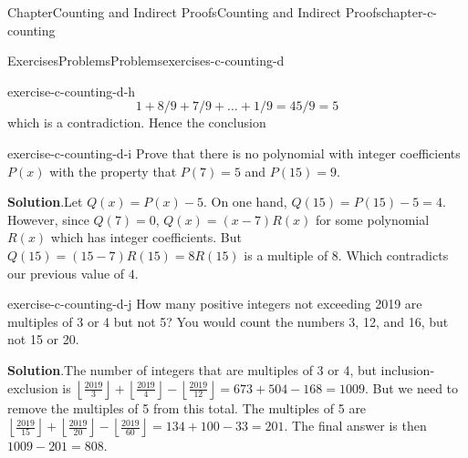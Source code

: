 \documentclass[oneside,10pt,]{book}
\newcommand{\blocktitlefont}{\relax}
\numberwithin{equation}{section}
\begin{document}
\begin{chapterptx}{Chapter}{Counting and Indirect Proofs}{}{Counting and Indirect Proofs}{}{}{chapter-c-counting}
\begin{exercises-section}{Exercises}{Problems}{}{Problems}{}{}{exercises-c-counting-d}
\begin{divisionexercise}{7}{}{}{exercise-c-counting-d-h}
\begin{equation*}
1 + 8/9 + 7/9 + \dots + 1/9 = 45/9 = 5
\end{equation*}
which is a contradiction. Hence the conclusion%
\end{divisionexercise}%
\begin{divisionexercise}{8}{}{}{exercise-c-counting-d-i}%
Prove that there is no polynomial with integer coefficients \(P(x)\) with the property that \(P(7) = 5\) and \(P(15) = 9\).%
\par\smallskip%
\noindent\textbf{\blocktitlefont Solution}.\hypertarget{solution-c-counting-d-i-b}{}\quad{}Let \(Q(x)=P(x)-5\).  On one hand, \(Q(15)=P(15)-5 = 4\).  However, since \(Q(7)=0\), \(Q(x)=(x-7)R(x)\) for some polynomial \(R(x)\) which has integer coefficients.  But \(Q(15)=(15-7)R(15)=8 R(15)\) is a multiple of \(8\).  Which contradicts our previous value of \(4\).%
\end{divisionexercise}%
\begin{divisionexercise}{9}{}{}{exercise-c-counting-d-j}%
How many positive integers not exceeding 2019 are multiples of 3 or 4 but not 5? You would count the numbers 3, 12, and 16, but not 15 or 20.%
\par\smallskip%
\noindent\textbf{\blocktitlefont Solution}.\hypertarget{solution-c-counting-d-j-b}{}\quad{}The number of integers that are multiples of 3 or 4, but inclusion-exclusion is \(\left\lfloor \frac{2019}{3}\right\rfloor +\left\lfloor \frac{2019}{4}\right\rfloor
-\left\lfloor \frac{2019}{12}\right\rfloor =673+504-168=1009\). But we need to remove the multiples of 5 from this total. The multiples of 5 are \(\left\lfloor \frac{2019}{15}\right\rfloor +\left\lfloor \frac{2019}{20}\right\rfloor -\left\lfloor \frac{2019}{60}\right\rfloor =134+100-33=201\). The final answer is then \(1009-201=808\).%
\end{divisionexercise}%
\end{exercises-section}
\end{chapterptx}
%
%
\typeout{************************************************}
\typeout{************************************************}
%
\end{document}
